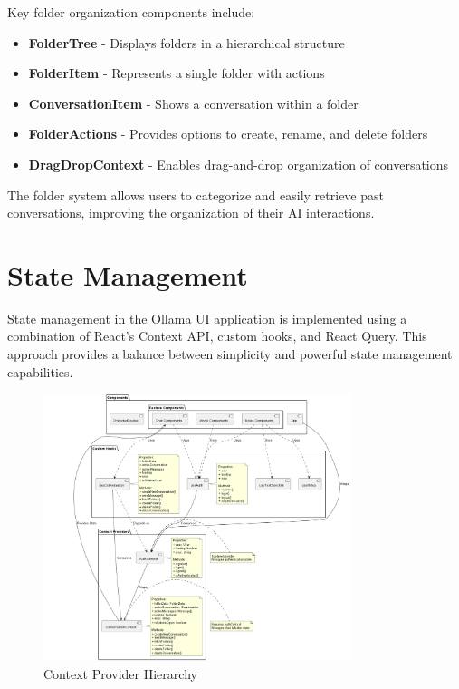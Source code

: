 Key folder organization components include:

\begin{itemize}
  \item \textbf{FolderTree} - Displays folders in a hierarchical structure
  \item \textbf{FolderItem} - Represents a single folder with actions
  \item \textbf{ConversationItem} - Shows a conversation within a folder
  \item \textbf{FolderActions} - Provides options to create, rename, and delete folders
  \item \textbf{DragDropContext} - Enables drag-and-drop organization of conversations
\end{itemize}

The folder system allows users to categorize and easily retrieve past conversations, improving the organization of their AI interactions.

\section{State Management}

State management in the Ollama UI application is implemented using a combination of React's Context API, custom hooks, and React Query. This approach provides a balance between simplicity and powerful state management capabilities.

\begin{figure}[h]
    \centering
    \includegraphics[width=0.8\textwidth]{./Chapter07/figures/context_provider_hierarchy.png}
    \caption{Context Provider Hierarchy}
    \label{fig:context-provider-hierarchy}
\end{figure}

